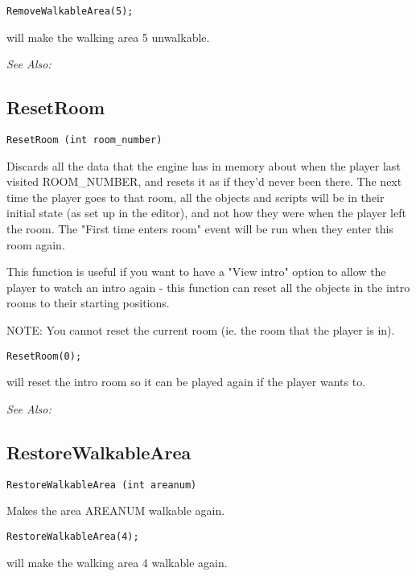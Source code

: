 \begin{verbatim}
RemoveWalkableArea(5);
\end{verbatim}
will make the walking area 5 unwalkable.

\it{See Also:} 


\subsection{ResetRoom}\label{ResetRoom}%

\begin{verbatim}
ResetRoom (int room_number)
\end{verbatim}
Discards all the data that the engine has in memory about when the player
last visited ROOM_NUMBER, and resets it as if they'd never been there. The
next time the player goes to that room, all the objects and scripts will
be in their initial state (as set up in the editor), and not how they were
when the player left the room. The "First time enters room" event will be
run when they enter this room again.

This function is useful if you want to have a "View intro" option to allow
the player to watch an intro again - this function can reset all the
objects in the intro rooms to their starting positions.

NOTE: You cannot reset the current room (ie. the room that the player is in).

\begin{verbatim}
ResetRoom(0);
\end{verbatim}
will reset the intro room so it can be played again if the player wants to.

\it{See Also:} 


\subsection{RestoreWalkableArea}\label{RestoreWalkableArea}%

\begin{verbatim}
RestoreWalkableArea (int areanum)
\end{verbatim}
Makes the area AREANUM walkable again.

\begin{verbatim}
RestoreWalkableArea(4);
\end{verbatim}
will make the walking area 4 walkable again.

